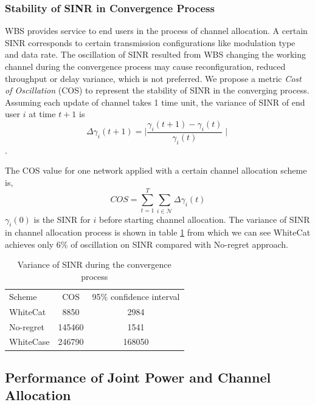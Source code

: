 \documentclass[times]{ettauth}
\theoremstyle{mytheoremstyle}
\theoremstyle{mytheoremstyle}
\theoremstyle{mytheoremstyle}
\begin{document}
\subsubsection*{Stability of SINR in Convergence Process}
WBS provides service to end users in the process of channel allocation. 
A certain SINR corresponds to certain transmission configurations like modulation type and data rate. 
The oscillation of SINR resulted from WBS changing the working channel during the convergence process may cause reconfiguration, reduced throughput or delay variance, which is not preferred.
We propose a metric \textit{Cost of Oscillation} (COS) to represent the stability of SINR in the converging process.
Assuming each update of channel takes 1 time unit, the variance of SINR of end user $i$ at time $t+1$ is \[\varDelta  \gamma_i(t+1)=\mid\frac{\gamma_i(t+1)-\gamma_i(t)}{\gamma_i(t)} \mid\]. 

The COS value for one network applied with a certain channel allocation scheme is,
\begin{equation}
\label{cos}
			COS = \sum\limits_{t=1}^T   \sum\limits_{i\in \mathcal{N}} \varDelta  \gamma_i(t)
			\end{equation}
$\gamma_i(0)$ is the SINR for $i$ before starting channel allocation.
The variance of SINR in channel allocation process is shown in table \ref{costable} from which we can see WhiteCat achieves only 6\% of oscillation on SINR compared with No-regret approach.
\begin{table}[!h]
\centering
\begin{tabular}{|l|c|c|}
  \hline
  Scheme			 						& COS 					& 95\% confidence interval\\
    \hhline{|=|=|=|}
  WhiteCat									& 8850					& 2984\\\hline
  No-regret									& 145460				& 1541\\\hline
  WhiteCase 								& 246790 				& 168050\\ 
  \hline
\end{tabular}
\caption{Variance of SINR during the convergence process}
\label{costable}
\end{table}



\subsection{Performance of Joint Power and Channel Allocation}
\label{joint}
\end{document}
